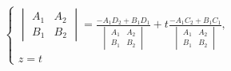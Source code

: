 \documentclass[a4paper]{article}
\begin{document}
\begin{hproof}
\begin{equation}
\begin{cases}
{\begin{vmatrix}
                                                                                                                                                                                           A_1 & A_2 \\
                                                                                                                                                                                           B_1 & B_2
                                                                                                               \end{vmatrix}} = \frac{\displaystyle -A_1D_2+B_1D_1}{\begin{vmatrix}
                                                                                                                                                                        A_1 & A_2 \\
                                                                                                                                                                        B_1 & B_2
                                                                                                               \end{vmatrix}} + t\frac{\displaystyle -A_1C_2+B_1C_1}{\begin{vmatrix}
                                                                                                                                                                         A_1 & A_2 \\
                                                                                                                                                                         B_1 & B_2
                                                                                                               \end{vmatrix}},
                                                                                                               \\
                                                                                                               z = t
                                                                                                           \end{cases}
        \end{equation}


\end{hproof}
\end{document}
